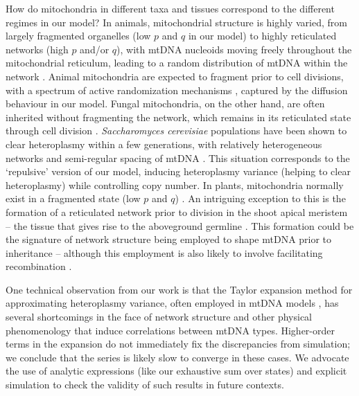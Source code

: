 \documentclass{article}
\begin{document}
How do mitochondria in different taxa and tissues correspond to the different regimes in our model? In animals, mitochondrial structure is highly varied, from largely fragmented organelles (low $p$ and $q$ in our model) to highly reticulated networks (high $p$ and/or $q$), with mtDNA nucleoids moving freely throughout the mitochondrial reticulum, leading to a random distribution of mtDNA within the network \citep{legros2004organization, sasaki2017live}. Animal mitochondria are expected to fragment prior to cell divisions, with a spectrum of active randomization mechanisms \citep{pangou2021multifaceted, moore2021actin}, captured by the diffusion behaviour in our model. Fungal mitochondria, on the other hand, are often inherited without fragmenting the network, which remains in its reticulated state through cell division \citep{mendoza2020mitochondrial}. \textit{Saccharomyces cerevisiae} populations have been shown to clear heteroplasmy within a few generations, with relatively heterogeneous networks and semi-regular spacing of mtDNA \citep{jakubke2021cristae}. This situation corresponds to the `repulsive' version of our model, inducing heteroplasmy variance (helping to clear heteroplasmy) while controlling copy number. In plants, mitochondria normally exist in a fragmented state (low $p$ and $q$) \citep{logan2010dynamic, chustecki2021network}. An intriguing exception to this is the formation of a reticulated network prior to division in the shoot apical meristem -- the tissue that gives rise to the aboveground germline \citep{segui2009mitochondrial}. This formation could be the signature of network structure being employed to shape mtDNA prior to inheritance -- although this employment is also likely to involve facilitating recombination \citep{edwards2021avoiding}. 
 
One technical observation from our work is that the Taylor expansion method for approximating heteroplasmy variance, often employed in mtDNA models \citep{johnston2015stochastic, hoitzing2017stochastic}, has several shortcomings in the face of network structure and other physical phenomenology that induce correlations between mtDNA types. Higher-order terms in the expansion do not immediately fix the discrepancies from simulation; we conclude that the series is likely slow to converge in these cases. We advocate the use of analytic expressions (like our exhaustive sum over states) and explicit simulation to check the validity of such results in future contexts.
\end{document}
